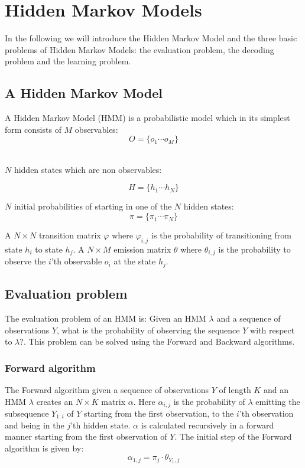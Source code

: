 \section{Hidden Markov Models}\label{sec:HMM}

In the following we will introduce the Hidden Markov Model and the three basic problems of Hidden Markov Models: the evaluation problem, the decoding problem and the learning problem.

\subsection{A Hidden Markov Model}

A Hidden Markov Model (HMM) is a probabilistic model which in its simplest form consists of $M$ observables:
$$O = \{o_1\cdots o_M\}$$\

$N$ hidden states which are non observables:


$$H= \{h_1\cdots h_N\}$$

$N$ initial probabilities of starting in one of the $N$ hidden states:
$$\pi = \{\pi_1\cdots\pi_N\}$$

A $ N \times N $ transition matrix $\varphi$ where $\varphi_{i,j}$ is the probability of transitioning from state $h_i$ to state $h_j$. A $ N \times M $ emission matrix $\theta$ where $\theta_{i,j}$ is the probability to observe the $i$'th observable $o_i$ at the state $h_j$. 

\subsection{Evaluation problem}

The evaluation problem of an HMM is: Given an HMM $\lambda$ and a sequence of observations $Y$, what is the probability of observing the sequence $Y$ with respect to $\lambda$?. This problem can be solved using the Forward and Backward algorithms.

\subsubsection{Forward algorithm}\label{sec:forward}

The Forward algorithm\cite{Bishop} given a sequence of observations $Y$ of length $K$ and an HMM $\lambda$ creates an $ N \times K$ matrix $\alpha$. Here $\alpha_{i,j}$ is the probability of $\lambda$ emitting the subsequence $Y_{1:i}$ of $Y$ starting from the first observation, to the $i$'th observation and being in the $j$'th hidden state. $\alpha$ is calculated recursively in a forward manner starting from the first observation of $Y$. 
The initial step of the Forward algorithm is given by:
$$\alpha_{1,j} = \pi_j\cdot\theta_{Y_1,j}$$

